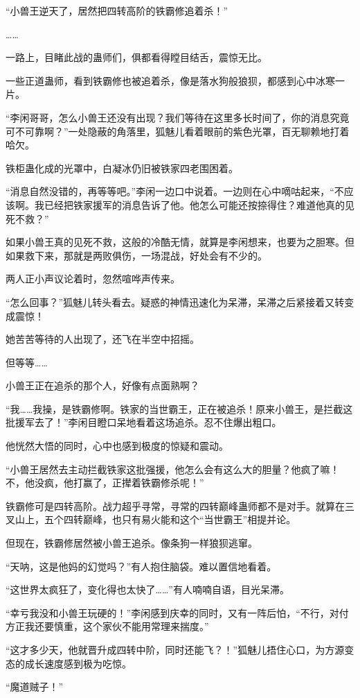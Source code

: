 \begin{this_body}
“小兽王逆天了，居然把四转高阶的铁霸修追着杀！”

……

一路上，目睹此战的蛊师们，俱都看得瞠目结舌，震惊无比。

一些正道蛊师，看到铁霸修也被追着杀，像是落水狗般狼狈，都感到心中冰寒一片。

“李闲哥哥，怎么小兽王还没有出现？我们等待在这里多长时间了，你的消息究竟可不可靠啊？”一处隐蔽的角落里，狐魅儿看着眼前的紫色光罩，百无聊赖地打着哈欠。

铁柜蛊化成的光罩中，白凝冰仍旧被铁家四老围困着。

“消息自然没错的，再等等吧。”李闲一边口中说着。一边则在心中嘀咕起来，“不应该啊。我已经把铁家援军的消息告诉了他。他怎么可能还按捺得住？难道他真的见死不救？”

如果小兽王真的见死不救，这般的冷酷无情，就算是李闲想来，也要为之胆寒。但如果救下来，那就是两败俱伤，一场混战，好处会有不少的。

两人正小声议论着时，忽然喧哗声传来。

“怎么回事？”狐魅儿转头看去。疑惑的神情迅速化为呆滞，呆滞之后紧接着又转变成震惊！

她苦苦等待的人出现了，还飞在半空中招摇。

但等等……

小兽王正在追杀的那个人，好像有点面熟啊？

“我……我操，是铁霸修啊。铁家的当世霸王，正在被追杀！原来小兽王，是拦截这批援军去了！”李闲目瞪口呆地看着这场追杀。忍不住爆出粗口。

他恍然大悟的同时，心中也感到极度的惊疑和震动。

“小兽王居然去主动拦截铁家这批强援，他怎么会有这么大的胆量？他疯了嘛！不，他没疯，他打赢了，正撵着铁霸修杀呢！”

铁霸修可是四转高阶。战力超乎寻常，寻常的四转巅峰蛊师都不是对手。就算在三叉山上，五个四转巅峰，也只有易火能和这个“当世霸王”相提并论。

但现在，铁霸修居然被小兽王追杀。像条狗一样狼狈逃窜。

“天呐，这是他妈的幻觉吗？”有人抱住脑袋。难以置信地看着。

“这世界太疯狂了，变化得也太快了……”有人喃喃自语，目光呆滞。

“幸亏我没和小兽王玩硬的！”李闲感到庆幸的同时，又有一阵后怕，“不行，对付方正我还要慎重，这个家伙不能用常理来揣度。”

“这才多少天，他就晋升成四转中阶，同时还能飞？！”狐魅儿捂住心口，为方源变态的成长速度感到极为吃惊。

“魔道贼子！”


\end{this_body}
